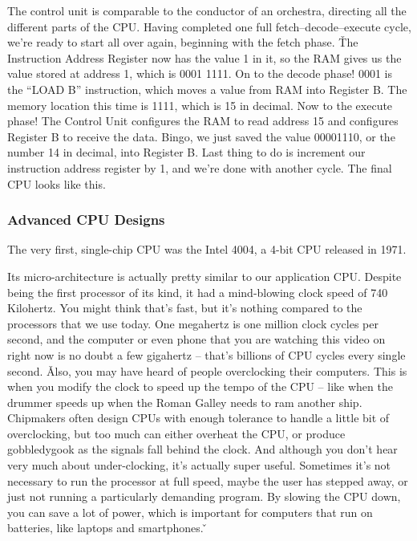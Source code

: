 The control unit is comparable to the conductor of an orchestra, directing all the different parts of the CPU\@.
Having completed one full fetch–decode–execute cycle, we're ready to start all over again, beginning with the fetch
phase. \v

The Instruction Address Register now has the value 1 in it, so the RAM gives us the value stored at address 1, which
is 0001 1111. On to the decode phase! 0001 is the ``LOAD B'' instruction, which moves a value from RAM into Register
B. The memory location this time is 1111, which is 15 in decimal. Now to the execute phase! The Control Unit
configures the RAM to read address 15 and configures Register B to receive the data. Bingo, we just saved the value
00001110, or the number 14 in decimal, into Register B. Last thing to do is increment our instruction address
register by 1, and we're done with another cycle. The final CPU looks like this.


\subsubsection{Advanced CPU Designs}

The very first, single-chip CPU was the Intel 4004, a 4-bit CPU released in 1971.


Its micro-architecture is actually pretty similar to our application CPU. Despite being the first processor of its
kind, it had a mind-blowing clock speed of 740 Kilohertz. You might think that's fast, but it's nothing compared to
the processors that we use today. One megahertz is one million clock cycles per second, and the computer or even
phone that you are watching this video on right now is no doubt a few gigahertz -- that's billions of CPU cycles
every single second. \v

Also, you may have heard of people overclocking their computers. This is when you modify the clock to speed up the
tempo of the CPU -- like when the drummer speeds up when the Roman Galley needs to ram another ship. Chipmakers
often design CPUs with enough tolerance to handle a little bit of overclocking, but too much can either overheat the
CPU, or produce gobbledygook as the signals fall behind the clock. And although you don't hear very much about
under-clocking, it's actually super useful. Sometimes it's not necessary to run the processor at full speed, maybe
the user has stepped away, or just not running a particularly demanding program. By slowing the CPU down, you can
save a lot of power, which is important for computers that run on batteries, like laptops and smartphones. \v

